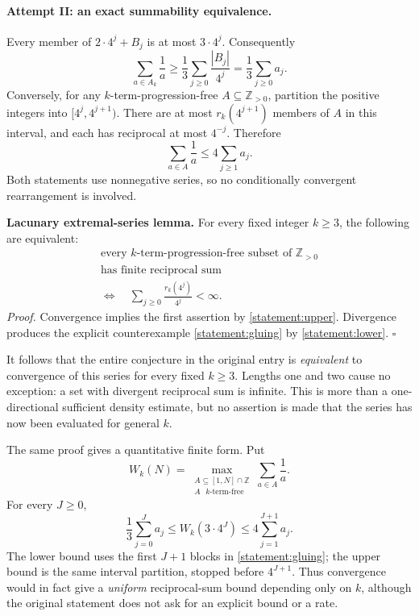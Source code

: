 \documentclass[11pt,a4paper]{article}
\newcommand{\Z}{\mathbb{Z}}
\newcommand{\A}{\mathbb{A}}
\numberwithin{equation}{section}
\begin{document}
\paragraph{Attempt II: an exact summability equivalence.}
Every member of $2\cdot4^j+B_j$ is at most $3\cdot4^j$.  Consequently
\begin{equation}\label{statement:lower}
 \sum_{a\in A_k}\frac1a
 \geq\frac13\sum_{j\geq0}\frac{|B_j|}{4^j}
 =\frac13\sum_{j\geq0}a_j.
\end{equation}
Conversely, for any $k$-term-progression-free $A\subseteq\Z_{>0}$,
partition the positive integers into $[4^j,4^{j+1})$.  There are at
most $r_k(4^{j+1})$ members of $A$ in this interval, and each has
reciprocal at most $4^{-j}$.  Therefore
\begin{equation}\label{statement:upper}
 \sum_{a\in A}\frac1a\leq4\sum_{j\geq1}a_j.
\end{equation}
Both statements use nonnegative series, so no conditionally convergent
rearrangement is involved.

\textbf{Lacunary extremal-series lemma.}
For every fixed integer $k\geq3$, the following are equivalent:
\[
 \begin{gathered}
 \text{every $k$-term-progression-free subset of $\Z_{>0}$}\\
 \text{has finite reciprocal sum}\\[2pt]
 \Longleftrightarrow\quad
 \sum_{j\geq0}\frac{r_k(4^j)}{4^j}<\infty.
 \end{gathered}
\]
\emph{Proof.} Convergence implies the first assertion by
\eqref{statement:upper}.  Divergence produces the explicit counterexample
\eqref{statement:gluing} by \eqref{statement:lower}. \hfill$\square$

It follows that the entire conjecture in the original entry is
\emph{equivalent} to convergence of this series for every fixed
$k\geq3$.  Lengths one and two cause no exception: a set with divergent
reciprocal sum is infinite.  This is more than a one-directional
sufficient density estimate, but no assertion is made that the
series has now been evaluated for general $k$.

The same proof gives a quantitative finite form.  Put
\[
 W_k(N)=\max_{\substack{A\subseteq[1,N]\cap\Z\\A\text{ $k$-term-free}}}
          \sum_{a\in A}\frac1a.
\]
For every $J\geq0$,
\begin{equation}\label{statement:finite}
 \frac13\sum_{j=0}^{J}a_j
 \leq W_k(3\cdot4^J)
 \leq4\sum_{j=1}^{J+1}a_j.
\end{equation}
The lower bound uses the first $J+1$ blocks in \eqref{statement:gluing}; the
upper bound is the same interval partition, stopped before $4^{J+1}$.
Thus convergence would in fact give a \emph{uniform} reciprocal-sum
bound depending only on $k$, although the original statement does not
ask for an explicit bound or a rate.
\end{document}

